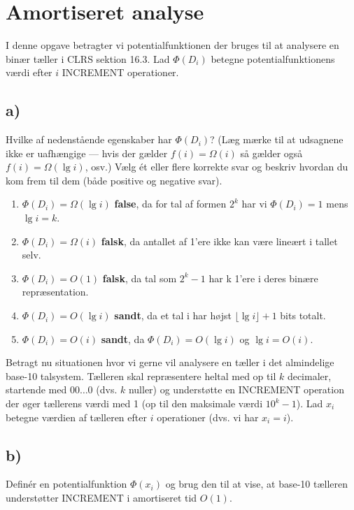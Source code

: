 \documentclass{article}
\theoremstyle{definition}
\begin{document}
\section{Amortiseret analyse}

I denne opgave betragter vi potentialfunktionen der bruges til at analysere en binær tæller i CLRS sektion 16.3. Lad $\Phi(D_i)$ betegne potentialfunktionens værdi efter $i$ INCREMENT operationer.

\subsection*{a)} Hvilke af nedenstående egenskaber har $\Phi(D_i)$? (Læg mærke til at udsagnene ikke er uafhængige --- hvis der gælder $f(i) = \Omega(i)$ så gælder også $f(i) = \Omega(\lg i)$, osv.) Vælg ét eller flere korrekte svar og beskriv hvordan du kom frem til dem (både positive og negative svar).

\begin{enumerate}
    \item $\Phi(D_i) = \Omega(\lg i)$ \textbf{false}, da for tal af formen $2^k$ har vi $\Phi(D_i) = 1$ mens $\lg i = k$.
    \item $\Phi(D_i) = \Omega(i)$ \textbf{falsk}, da antallet af 1'ere ikke kan være lineært i tallet selv.
    \item $\Phi(D_i) = O(1)$ \textbf{falsk}, da tal som $2^k - 1$ har k 1'ere i deres binære repræsentation.
    \item $\Phi(D_i) = O(\lg i)$ \textbf{sandt}, da et tal i har højst $\lfloor \lg i \rfloor + 1$ bits totalt.
    \item $\Phi(D_i) = O(i)$ \textbf{sandt}, da $\Phi(D_i) = O(\lg i)$ og $\lg i = O(i)$.
\end{enumerate}

Betragt nu situationen hvor vi gerne vil analysere en tæller i det almindelige base-10 talsystem. Tælleren skal repræsentere heltal med op til $k$ decimaler, startende med $00\ldots0$ (dvs. $k$ nuller) og understøtte en INCREMENT operation der øger tællerens værdi med 1 (op til den maksimale værdi $10^k - 1$). Lad $x_i$ betegne værdien af tælleren efter $i$ operationer (dvs. vi har $x_i = i$).

\subsection*{b)} Definér en potentialfunktion $\Phi(x_i)$ og brug den til at vise, at base-10 tælleren understøtter INCREMENT i amortiseret tid $O(1)$.
\end{document}
